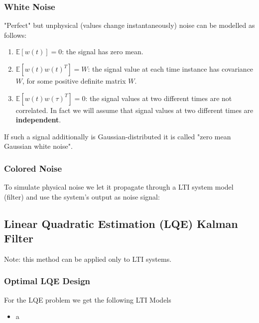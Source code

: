 \subsubsection{White Noise}
"Perfect" but unphysical (values change instantaneously) noise can be modelled as follows:
\begin{enumerate}
    \item $\mathbb{E}[w(t)]=0$: the signal has zero mean.
    \item $\mathbb{E}[w(t)w(t)^T]=W$: the signal value at each time instance has covariance $W$, for some positive definite matrix $W.$
    \item $\mathbb{E}[w(t)w(\tau)^T]=0$: the signal values at two different times are not correlated. In fact we will assume that signal values at two different times are \textbf{independent}.
\end{enumerate}
If such a signal additionally is Gaussian-distributed it is called "zero mean Gaussian white noise".

\subsubsection{Colored Noise}
To simulate physical noise we let it propagate through a LTI system model (filter) and use the system's output as noise signal:



\subsection{Linear Quadratic Estimation (LQE) Kalman Filter}
Note: this method can be applied only to LTI systems.

\subsubsection{Optimal LQE Design}
For the LQE problem we get the following LTI Models

%
\begin{itemize}
    \item a
\end{itemize}